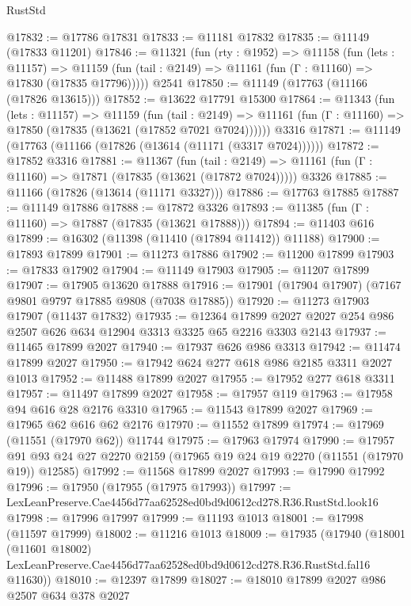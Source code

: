 \begin{lexlean}{RustStd}
\begin{coremodule}
@17832 := @17786 @17831
@17833 := @11181 @17832
@17835 := @11149 (@17833 @11201)
@17846 := @11321
    (fun (rty : @1952) =>
    @11158
      (fun (lets : @11157) =>
      @11159 (fun (tail : @2149) => @11161 (fun (Γ : @11160) => @17830 (@17835 @17796)))))
    @2541
@17850 := @11149 (@17763 (@11166 (@17826 @13615)))
@17852 := @13622 @17791 @15300
@17864 := @11343
    (fun (lets : @11157) =>
    @11159
      (fun (tail : @2149) =>
      @11161 (fun (Γ : @11160) => @17850 (@17835 (@13621 (@17852 @7021 @7024))))))
    @3316
@17871 := @11149 (@17763 (@11166 (@17826 (@13614 (@11171 (@3317 @7024))))))
@17872 := @17852 @3316
@17881 := @11367
    (fun (tail : @2149) => @11161 (fun (Γ : @11160) => @17871 (@17835 (@13621 (@17872 @7024)))))
    @3326
@17885 := @11166 (@17826 (@13614 (@11171 @3327)))
@17886 := @17763 @17885
@17887 := @11149 @17886
@17888 := @17872 @3326
@17893 := @11385 (fun (Γ : @11160) => @17887 (@17835 (@13621 @17888)))
@17894 := @11403 @616
@17899 := @16302 (@11398 (@11410 (@17894 @11412)) @11188)
@17900 := @17893 @17899
@17901 := @11273 @17886
@17902 := @11200 @17899
@17903 := @17833 @17902
@17904 := @11149 @17903
@17905 := @11207 @17899
@17907 := @17905 @13620 @17888
@17916 := @17901 (@17904 @17907) (@7167 @9801 @9797 @17885 @9808 (@7038 @17885))
@17920 := @11273 @17903 @17907 (@11437 @17832)
@17935 := @12364
    @17899
    @2027
    @2027
    @254
    @986
    @2507
    @626
    @634
    @12904
    @3313
    @3325
    @65
    @2216
    @3303
    @2143
@17937 := @11465 @17899 @2027
@17940 := @17937 @626 @986 @3313
@17942 := @11474 @17899 @2027
@17950 := @17942 @624 @277 @618 @986 @2185 @3311 @2027 @1013
@17952 := @11488 @17899 @2027
@17955 := @17952 @277 @618 @3311
@17957 := @11497 @17899 @2027
@17958 := @17957 @119
@17963 := @17958 @94 @616 @28 @2176 @3310
@17965 := @11543 @17899 @2027
@17969 := @17965 @62 @616 @62 @2176
@17970 := @11552 @17899
@17974 := @17969 (@11551 (@17970 @62)) @11744
@17975 := @17963 @17974
@17990 := @17957 @91 @93 @24 @27 @2270 @2159 (@17965 @19 @24 @19 @2270 (@11551 (@17970 @19)) @12585)
@17992 := @11568 @17899 @2027
@17993 := @17990 @17992
@17996 := @17950 (@17955 (@17975 @17993))
@17997 := LexLeanPreserve.Cae4456d77aa62528ed0bd9d0612cd278.R36.RustStd.look16
@17998 := @17996 @17997
@17999 := @11193 @1013
@18001 := @17998 (@11597 @17999)
@18002 := @11216 @1013
@18009 := @17935
    (@17940
      (@18001
        (@11601 @18002)
        LexLeanPreserve.Cae4456d77aa62528ed0bd9d0612cd278.R36.RustStd.fal16
        @11630))
@18010 := @12397 @17899
@18027 := @18010
    @17899
    @2027
    @986
    @2507
    @634
    @378
    @2027

\end{coremodule}
\end{lexlean}
